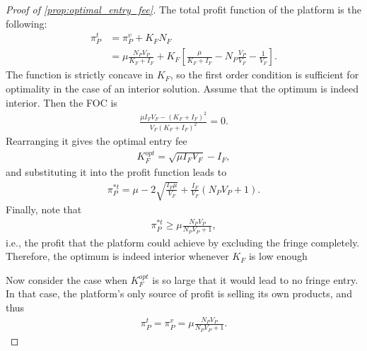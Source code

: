 \documentclass[a4paper]{article}
\begin{document}
\begin{proof}[Proof of \cref{prop:optimal_entry_fee}]
    The total profit function of the platform is the following:
    \begin{align*}
        \pi_P^t &= \pi_P^v + K_F N_F \\
        &= \mu \frac{N_P V_P}{K_F + I_F} + K_F \left[ \frac{\mu}{K_F + I_F} - N_P \frac{V_P}{V_F} - \frac{1}{V_F} \right].
    \end{align*}
    The function is strictly concave in $K_F$, so the first order condition is sufficient for optimality in the case of an interior solution.
    Assume that the optimum is indeed interior.
    Then the FOC is
    \begin{align*}
        \frac{\mu I_F V_F - (K_F + I_F)^2}{V_F (K_F + I_F)^2} = 0.
    \end{align*}
    Rearranging it gives the optimal entry fee
    \begin{align*}
        K_F^{opt} = \sqrt{\mu I_F V_F} - I_F,
    \end{align*}
    and substituting it into the profit function leads to
    \begin{align*}
        \pi_P^{*t} = \mu - 2\sqrt{\frac{I_F \mu}{V_F}} + \frac{I_F}{V_F} (N_P V_P + 1).
    \end{align*}
    Finally, note that
    \begin{align*}
        \pi_P^{*t} \geq \mu \frac{N_P V_P}{N_P V_P + 1},
    \end{align*}
    i.e., the profit that the platform could achieve by excluding the fringe completely.
    Therefore, the optimum is indeed interior whenever $K_F$ is low enough

    Now consider the case when $K_F^{opt}$ is so large that it would lead to no fringe entry.
    In that case, the platform's only source of profit is selling its own products, and thus
    \begin{align*}
        \pi_P^{t} = \pi_P^{v} = \mu \frac{ N_P V_P}{N_P V_P + 1}.
    \end{align*}
\end{proof}
\end{document}
